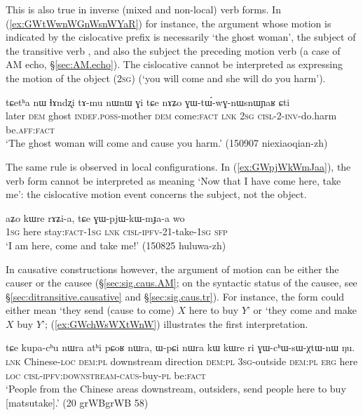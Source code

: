This is also true in inverse (mixed and non-local) verb forms. In (\ref{ex:GWtWwnWGnWsnWYaR}) for instance, the argument whose motion is indicated by the cislocative prefix is necessarily  `the ghost woman', the subject of the transitive verb , and also the subject the preceding motion verb  (a case of AM echo, §\ref{sec:AM.echo}). The cislocative  cannot be interpreted as expressing the motion of the object (\textsc{2sg}) (`you will come and she will do you harm'). 

\begin{exe}
\ex  \label{ex:GWtWwnWGnWsnWYaR}
 \gll  tɕetʰa nɯ ɬɤndʐi tɤ-mu nɯnɯ ɣi tɕe nɤʑo ɣɯ-tɯ́-wɣ-nɯsnɯɲaʁ ɕti \\
 later \textsc{dem} ghost \textsc{indef}.\textsc{poss}-mother \textsc{dem} come:\textsc{fact} \textsc{lnk} \textsc{2sg} \textsc{cisl}-2-\textsc{inv}-do.harm be.\textsc{aff}:\textsc{fact} \\
\glt `The ghost woman will come and cause you harm.' (150907 niexiaoqian-zh)
\end{exe}

The same rule is observed in local configurations. In (\ref{ex:GWpjWkWmJaa}), the verb form  cannot be interpreted as meaning `Now that I have come here, take me': the cislocative motion event concerns the subject, not the object.

\begin{exe}
\ex  \label{ex:GWpjWkWmJaa}
 \gll aʑo kɯre rɤʑi-a, tɕe ɣɯ-pjɯ-kɯ-mɟa-a wo \\
 \textsc{1sg} here stay:\textsc{fact}-\textsc{1sg} \textsc{lnk} \textsc{cisl}-\textsc{ipfv}-2\fl{}1-take-\textsc{1sg} \textsc{sfp} \\
 \glt `I am here, come and take me!' (150825 huluwa-zh)
\end{exe}

In causative constructions however, the argument of motion can be either the causer  or the causee (§\ref{sec:sig.caus.AM}; on the syntactic status of the causee, see §\ref{sec:ditransitive.causative} and §\ref{sec:sig.caus.tr}). For instance, the form  could either mean `they send (cause to come) $X$ here to buy $Y$' or `they come and make $X$ buy $Y$'; (\ref{ex:GWchWsWXtWnW}) illustrates the first interpretation.

\begin{exe}
\ex \label{ex:GWchWsWXtWnW}
\gll tɕe kupa-cʰu nɯra atʰi pɕoʁ nɯra, ɯ-pɕi nɯra kɯ kɯre ri ɣɯ-cʰɯ-sɯ-χtɯ-nɯ ŋu.  \\
\textsc{lnk} Chinese-\textsc{loc} \textsc{dem}:\textsc{pl} downstream direction \textsc{dem}:\textsc{pl} \textsc{3sg}-outside  \textsc{dem}:\textsc{pl}  \textsc{erg} here \textsc{loc} \textsc{cisl}-\textsc{ipfv}:\textsc{downstream}-\textsc{caus}-buy-\textsc{pl} be:\textsc{fact} \\ 
\glt `People from the Chinese areas downstream, outsiders, send people here to buy [matsutake].' (20 grWBgrWB 58)  
\end{exe} 

